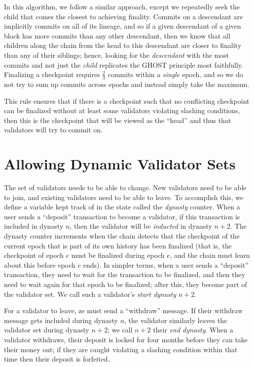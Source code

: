 \documentclass[12pt, final]{article}
\newcommand{\epoch}{\ensuremath{e}\xspace}
\begin{document}
In this algorithm, we follow a similar approach, except we repeatedly seek the child that comes the closest to achieving finality. Commits on a descendant are implicitly commits on all of its lineage, and so if a given descendant of a given block has more commits than any other descendant, then we know that all children along the chain from the head to this descendant are closer to finality than any of their siblings; hence, looking for the \textit{descendant} with the most commits and not just the \textit{child} replicates the GHOST principle most faithfully. Finalizing a checkpoint requires $\frac{2}{3}$ commits within a \textit{single} epoch, and so we do not try to sum up commits across epochs and instead simply take the maximum.

This rule ensures that if there is a checkpoint such that no conflicting checkpoint can be finalized without at least some validators violating slashing conditions, then this is the checkpoint that will be viewed as the ``head'' and thus that validators will try to commit on.

\section{Allowing Dynamic Validator Sets}
\label{sect:join_and_leave}

The set of validators needs to be able to change.  New validators need to be able to join, and existing validators need to be able to leave.  To accomplish this, we define a variable kept track of in the state called the \textit{dynasty} counter. When a user sends a ``deposit'' transaction to become a validator, if this transaction is included in dynasty $n$, then the validator will be \textit{inducted} in dynasty $n+2$. The dynasty counter increments when the chain detects that the checkpoint of the current epoch that is part of its own history has been finalized (that is, the checkpoint of epoch \epoch must be finalized during epoch \epoch, and the chain must learn about this before epoch \epoch ends). In simpler terms, when a user sends a ``deposit'' transaction, they need to wait for the transaction to be finalized, and then they need to wait again for that epoch to be finalized; after this, they become part of the validator set. We call such a validator's \textit{start dynasty} $n+2$. 

For a validator to leave, ze must send a ``withdraw'' message. If their withdraw message gets included during dynasty $n$, the validator similarly leaves the validator set during dynasty $n+2$; we call $n+2$ their \textit{end dynasty}. When a validator withdraws, their deposit is locked for four months  before they can take their money out; if they are caught violating a slashing condition within that time then their deposit is forfeited.
\end{document}

